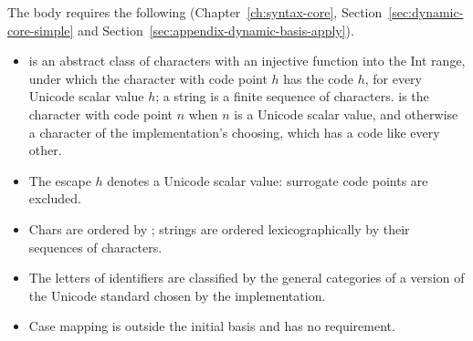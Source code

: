 The body requires the following (Chapter~\ref{ch:syntax-core},
Section~\ref{sec:dynamic-core-simple} and
Section~\ref{sec:appendix-dynamic-basis-apply}).
\begin{itemize}
\item {} is an abstract class of characters with an injective function
   into the Int range, under which the character with code point
  $h$ has the code $h$, for every Unicode scalar value $h$; a string is a
  finite sequence of characters.  is the character with
  code point $n$ when $n$ is a Unicode scalar value, and otherwise a character
  of the implementation's choosing, which has a code like every other. %
\item The escape $h$\kw{\kwrb} denotes a Unicode
  scalar value: surrogate code points are excluded. %
\item Chars are ordered by ; strings are ordered lexicographically
  by their sequences of characters. %
\item The letters of identifiers are classified by the general categories of
  a version of the Unicode standard chosen by the implementation. %
\item Case mapping is outside the initial basis and has no requirement. %
\end{itemize}

